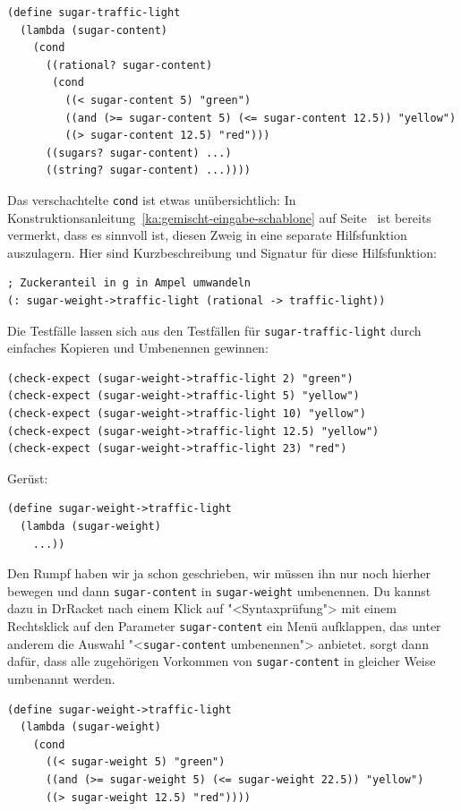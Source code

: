 %
\begin{lstlisting}
(define sugar-traffic-light
  (lambda (sugar-content)
    (cond
      ((rational? sugar-content) 
       (cond
         ((< sugar-content 5) "green")
         ((and (>= sugar-content 5) (<= sugar-content 12.5)) "yellow")
         ((> sugar-content 12.5) "red")))
      ((sugars? sugar-content) ...)
      ((string? sugar-content) ...))))
\end{lstlisting}         
%
Das verschachtelte \lstinline{cond} ist etwas unübersichtlich: In
Konstruktionsanleitung~\ref{ka:gemischt-eingabe-schablone} auf
Seite~\pageref{page:separate-mixed-procs} ist bereits vermerkt, dass
es sinnvoll ist, diesen Zweig in eine separate Hilfsfunktion
auszulagern.  Hier sind Kurzbeschreibung und Signatur für diese
Hilfsfunktion:
%
\begin{lstlisting}
; Zuckeranteil in g in Ampel umwandeln
(: sugar-weight->traffic-light (rational -> traffic-light))
\end{lstlisting}
%
Die Testfälle lassen sich aus den Testfällen für
\lstinline{sugar-traffic-light} durch einfaches Kopieren und Umbenennen
gewinnen:
%
\begin{lstlisting}
(check-expect (sugar-weight->traffic-light 2) "green")
(check-expect (sugar-weight->traffic-light 5) "yellow")
(check-expect (sugar-weight->traffic-light 10) "yellow")
(check-expect (sugar-weight->traffic-light 12.5) "yellow")
(check-expect (sugar-weight->traffic-light 23) "red")
\end{lstlisting}
%
Gerüst:
%
\begin{lstlisting}
(define sugar-weight->traffic-light
  (lambda (sugar-weight)
    ...))
\end{lstlisting}
%
Den Rumpf haben wir ja schon geschrieben, wir müssen ihn nur noch
hierher bewegen und dann \lstinline{sugar-content} in
\lstinline{sugar-weight} umbenennen.
Du kannst dazu in DrRacket
nach einem Klick auf "<Syntaxprüfung"> mit einem
Rechtsklick auf den Parameter \lstinline{sugar-content} ein Menü aufklappen, das unter
anderem die Auswahl "<\lstinline{sugar-content} umbenennen"> anbietet. \drscheme{} sorgt dann
dafür, dass alle zugehörigen Vorkommen von \lstinline{sugar-content} in gleicher Weise
umbenannt werden.\label{def:sugar-weight-traffic-light}
%
\begin{lstlisting}
(define sugar-weight->traffic-light
  (lambda (sugar-weight)
    (cond
      ((< sugar-weight 5) "green")
      ((and (>= sugar-weight 5) (<= sugar-weight 22.5)) "yellow")
      ((> sugar-weight 12.5) "red"))))
\end{lstlisting}
